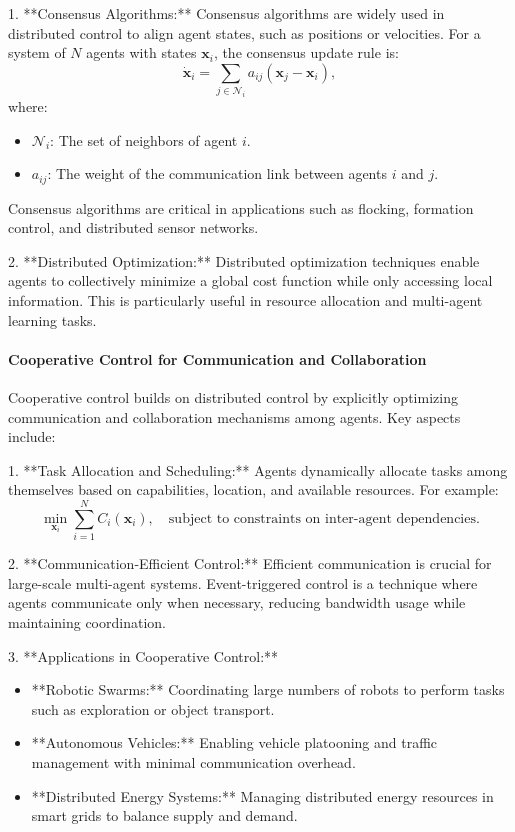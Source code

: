 \documentclass{IEEEojcsys}
\begin{document}
1. **Consensus Algorithms:**
   Consensus algorithms are widely used in distributed control to align agent states, such as positions or velocities. For a system of $N$ agents with states $\mathbf{x}_i$, the consensus update rule is:
   \[
   \dot{\mathbf{x}}_i = \sum_{j \in \mathcal{N}_i} a_{ij} (\mathbf{x}_j - \mathbf{x}_i),
   \]
   where:
   \begin{itemize}
       \item $\mathcal{N}_i$: The set of neighbors of agent $i$.
       \item $a_{ij}$: The weight of the communication link between agents $i$ and $j$.
   \end{itemize}
   Consensus algorithms are critical in applications such as flocking, formation control, and distributed sensor networks.

2. **Distributed Optimization:**
   Distributed optimization techniques enable agents to collectively minimize a global cost function while only accessing local information. This is particularly useful in resource allocation and multi-agent learning tasks.

\paragraph{Cooperative Control for Communication and Collaboration}
Cooperative control builds on distributed control by explicitly optimizing communication and collaboration mechanisms among agents. Key aspects include:

1. **Task Allocation and Scheduling:**
   Agents dynamically allocate tasks among themselves based on capabilities, location, and available resources. For example:
   \[
   \min_{\mathbf{x}_i} \sum_{i=1}^N C_i(\mathbf{x}_i), \quad \text{subject to constraints on inter-agent dependencies}.
   \]

2. **Communication-Efficient Control:**
   Efficient communication is crucial for large-scale multi-agent systems. Event-triggered control is a technique where agents communicate only when necessary, reducing bandwidth usage while maintaining coordination.

3. **Applications in Cooperative Control:**
   \begin{itemize}
       \item **Robotic Swarms:** Coordinating large numbers of robots to perform tasks such as exploration or object transport.
       \item **Autonomous Vehicles:** Enabling vehicle platooning and traffic management with minimal communication overhead.
       \item **Distributed Energy Systems:** Managing distributed energy resources in smart grids to balance supply and demand.
   \end{itemize}
\end{document}
